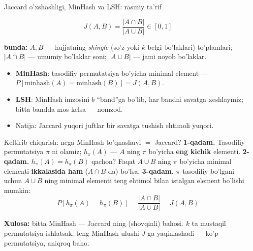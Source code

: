 \documentclass[aspectratio=169,11pt]{beamer}
\newcommand{\bunda}[1]{{\small\textbf{bunda:}\; #1}}
\begin{document}
\begin{frame}{Jaccard o'xshashligi, MinHash va LSH: rasmiy ta'rif}
  \begin{tcolorbox}[defbox,title=Ta'rif: Jaccard o'xshashligi]
    \vspace{-0.4em}
    $$ J(A,B) = \frac{|A \cap B|}{|A \cup B|} \in [0,1] $$
  \end{tcolorbox}
  \vspace{3pt}
  \bunda{$A,B$ --- hujjatning \textit{shingle} (so'z yoki $k$-belgi
  bo'laklari) to'plamlari; $|A\cap B|$ --- umumiy bo'laklar soni;
  $|A\cup B|$ --- jami noyob bo'laklar.}
  \vspace{5pt}
  \begin{itemize}\small\setlength\itemsep{3pt}
    \item \textbf{MinHash}: tasodifiy permutatsiya bo'yicha minimal element ---
          $P[\text{minhash}(A){=}\text{minhash}(B)] = J(A,B)$.
    \item \textbf{LSH}: MinHash imzosini $b$ ``band''ga bo'lib, har bandni
          savatga xeshlaymiz; bitta bandda mos kelsa --- nomzod.
    \item Natija: Jaccard yuqori juftlar bir savatga tushish ehtimoli yuqori.
  \end{itemize}
\end{frame}

\begin{frame}{Keltirib chiqarish: nega MinHash to'qnashuvi $=$ Jaccard?}
  \textbf{1-qadam.} Tasodifiy permutatsiya $\pi$ ni olamiz; $h_\pi(A)$ ---
  $A$ ning $\pi$ bo'yicha \textbf{eng kichik} elementi.
  \pause
  \textbf{2-qadam.} $h_\pi(A)=h_\pi(B)$ qachon? Faqat $A\cup B$ ning
  $\pi$ bo'yicha minimal elementi \textbf{ikkalasida ham} ($A\cap B$ da)
  bo'lsa.
  \pause
  \textbf{3-qadam.} $\pi$ tasodifiy bo'lgani uchun $A\cup B$ ning minimal
  elementi teng ehtimol bilan istalgan element bo'lishi mumkin:
  $$ P[h_\pi(A)=h_\pi(B)] = \frac{|A\cap B|}{|A\cup B|} = J(A,B) $$
  \begin{tcolorbox}[okbox]
    \small \textbf{Xulosa:} bitta MinHash --- Jaccard ning (shovqinli)
    bahosi. $k$ ta mustaqil permutatsiya ishlatsak, teng MinHash ulushi
    $J$ ga yaqinlashadi --- ko'p permutatsiya, aniqroq baho.
  \end{tcolorbox}
\end{frame}
\end{document}

